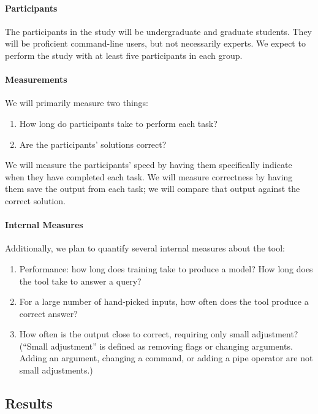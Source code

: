 \paragraph{Participants} The participants in the study will be undergraduate and
graduate students. They will be proficient command-line users, but not
necessarily experts. We expect to perform the study with at least five
participants in each group.

\paragraph{Measurements} We will primarily measure two things:
\begin{enumerate}\itemsep-1pt
    \item How long do participants take to perform each task?
    \item Are the participants' solutions correct?
\end{enumerate}
We will measure the participants' speed by having them specifically indicate
when they have completed each task. We will measure correctness by having them
save the output from each task; we will compare that output against the correct
solution.

\paragraph{Internal Measures} Additionally, we plan to quantify several internal
measures about the tool:
\begin{enumerate}\itemsep-1pt
    \item Performance: how long does training take to produce a model? How
        long does the tool take to answer a query?
    \item For a large number of hand-picked inputs, how often does the
        tool produce a correct answer?
    \item How often is the output close to correct, requiring only small
        adjustment? (``Small adjustment'' is defined as removing flags or
        changing arguments. Adding an argument, changing a command, or
        adding a pipe operator are not small adjustments.)
\end{enumerate}

\subsection{Results}

